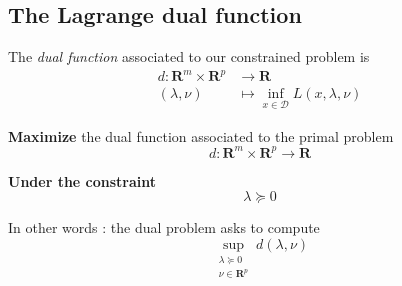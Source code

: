 \subsection{The Lagrange dual function}

\begin{definition}
    The \textit{dual function} associated to our constrained problem is
    \[
        \begin{aligned}
            d : \mathbf R^m \times \mathbf R^p & \longrightarrow \mathbf R \\
            (\lambda, \nu) & \longmapsto \inf_{x \in \mathcal D} L(x,\lambda,\nu)
        \end{aligned}
    \]
\end{definition}

\begin{problem}
    \textbf{Maximize} the dual function associated to the primal problem
    \[ 
        d : \mathbf R^m \times \mathbf R^p \to \mathbf R
    \]

    \textbf{Under the constraint}
    \[
        \lambda \succeq 0
    \]
\end{problem}

In other words : the dual problem asks to compute
\[
    \sup_{\substack{ \lambda \succeq 0 \\ \nu \in \mathbf R^p }} d(\lambda, \nu)
\]


